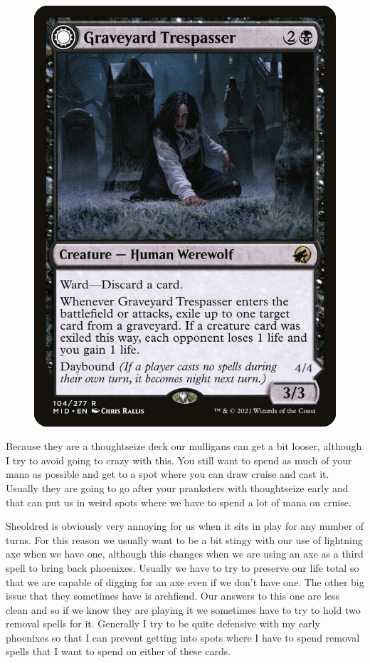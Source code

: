 \documentclass[12pt]{article}
\begin{document}
\begin{figure}
    \includegraphics[width=0.9\linewidth]{Cards/trespasser.jpg}
\end{figure}

Because they are a thoughtseize deck our mulligans can get a bit looser, although I try to avoid going to crazy with this. You still want to spend as much of your mana as possible and get to a spot where you can draw cruise and cast it. Usually they are going to go after your pranksters with thoughtseize early and that can put us in weird spots where we have to spend a lot of mana on cruise.

Sheoldred is obviously very annoying for us when it sits in play for any number of turns. For this reason we usually want to be a bit stingy with our use of lightning axe when we have one, although this changes when we are using an axe as a third spell to bring back phoenixes. Usually we have to try to preserve our life total so that we are capable of digging for an axe even if we don't have one. The other big issue that they sometimes have is archfiend. Our answers to this one are less clean and so if we know they are playing it we sometimes have to try to hold two removal spells for it. Generally I try to be quite defensive with my early phoenixes so that I can prevent getting into spots where I have to spend removal spells that I want to spend on either of these cards.
\end{document}
